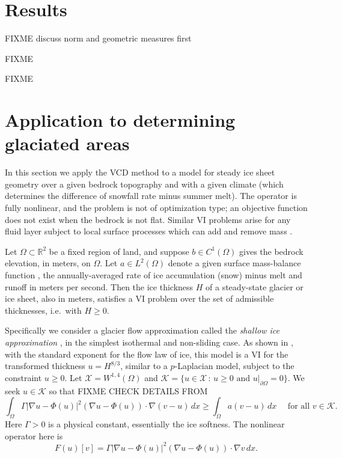 \documentclass[]{interact}
\theoremstyle{plain}%
\theoremstyle{definition}
\theoremstyle{remark}
\newcommand{\RR}{\mathbb{R}}
\newcommand{\grad}{\nabla}
\newcommand{\cK}{\mathcal{K}}
\newcommand{\cX}{\mathcal{X}}
\begin{document}
\section{Results} \label{sec:results}

FIXME discuss norm and geometric measures first

FIXME \cite{Kosub2016} \cite{JungeblutKleistMiltzow2022}

FIXME


\section{Application to determining glaciated areas} \label{sec:app}

In this section we apply the VCD method to a model for steady ice sheet geometry over a given bedrock topography and with a given climate (which determines the difference of snowfall rate minus summer melt).  The operator is fully nonlinear, and the problem is not of optimization type; an objective function does not exist when the bedrock is not flat.  Similar VI problems arise for any fluid layer subject to local surface processes which can add and remove mass \cite{Bueler2021b}.

Let $\Omega \subset \RR^2$ be a fixed region of land, and suppose $b \in C^1(\Omega)$ gives the bedrock elevation, in meters, on $\Omega$.  Let $a \in L^2(\Omega)$ denote a given surface mass-balance function \cite{GreveBlatter2009}, the annually-averaged rate of ice accumulation (snow) minus melt and runoff in meters per second.  Then the ice thickness $H$ of a steady-state glacier or ice sheet, also in meters, satisfies a VI problem over the set of admissible thicknesses, i.e.~with $H\ge 0$.

Specifically we consider a glacier flow approximation called the \emph{shallow ice approximation} \cite{GreveBlatter2009}, in the simplest isothermal and non-sliding case.   As shown in \cite{JouvetBueler2012}, with the standard exponent for the flow law of ice, this model is a VI for the transformed thickness $u=H^{8/3}$, similar to a $p$-Laplacian model, subject to the constraint $u\ge 0$.  Let $\cX = W^{1,4}(\Omega)$ and $\cK = \{u \in \cX\,:\,u\ge 0 \text{ and } u|_{\partial\Omega}=0\}$.  We seek $u\in\cK$ so that  FIXME CHECK DETAILS FROM \cite{JouvetBueler2012}
\begin{equation}
\int_\Omega \Gamma |\grad u - \Phi(u)|^2 (\grad u - \Phi(u)) \cdot \grad (v-u) \,dx \ge \int_\Omega a (v-u)\,dx \quad \text{ for all } v \in \cK. \label{eq:siavi}
\end{equation}
Here $\Gamma>0$ is a physical constant, essentially the ice softness.  The nonlinear operator here is
\begin{equation}
F(u)[v] = \Gamma |\grad u - \Phi(u)|^2 (\grad u - \Phi(u)) \cdot \grad v \,dx. \label{eq:siaoperator}
\end{equation}
\end{document}
